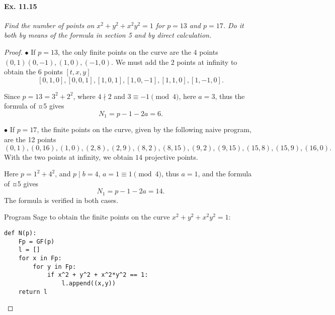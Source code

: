 \documentclass[11pt,a4paper]{article}
\begin{document}
\paragraph{Ex. 11.15}{\it Find the number of points on $x^2 + y^2 + x^2y^2 = 1$ for $p=13$ and $p=17$. Do it both by means of the formula in section 5 and by direct calculation.
}
\begin{proof}
$\bullet$ If $p=13$, the only finite points on the curve are the $4$ points $(0,1)(0,-1),(1,0),(-1,0)$. We must add the $2$ points  at infinity to obtain the $6$ points $[t,x,y]$ 
$$[0,1,0],[0,0,1], [1,0,1],[1,0,-1],[1,1,0],[1,-1,0].$$

Since $p = 13 = 3^2 + 2^2$, where $4 \nmid 2$ and $3 \equiv -1 \pmod 4$, here $a = 3$, thus the formula of ¤5 gives
$$N_1 = p-1 - 2a = 6.$$

$\bullet$ If $p = 17$, the finite points on the curve, given by the following naive program, are the 12 points
       	$$(0, 1), (0, 16), (1, 0), (2, 8), (2, 9), (8, 2), (8, 15), (9, 2), (9,15), (15, 8), (15, 9), (16, 0).$$
With the two points at infinity, we obtain $14$ projective points.

Here $p = 1^2 + 4^2$, and $p \mid b=4$, $a = 1 \equiv 1 \pmod 4$, thus $a = 1$, and the formula of ¤5 gives
$$N_1 = p-1-2a =14.$$
The formula is verified in both cases.

\bigskip

Program Sage to obtain the finite points on the curve $x^2 + y^2 + x^2y^2 =1$:
\begin{verbatim}
def N(p):
    Fp = GF(p)
    l = []
    for x in Fp:
        for y in Fp:
            if x^2 + y^2 + x^2*y^2 == 1:
                l.append((x,y))
    return l
\end{verbatim}
\end{proof}
\end{document}
